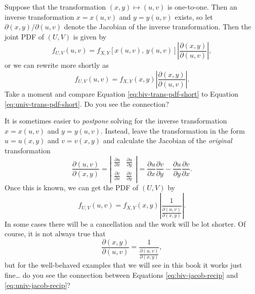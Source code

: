 \documentclass[captions=tableheading]{scrbook}
\begin{document}
Suppose that the transformation \((x,y)\longmapsto(u,v)\) is one-to-one. Then an inverse transformation \(x=x(u,v)\) and \(y=y(u,v)\) exists, so let \(\partial(x,y)/\partial(u,v)\) denote the Jacobian of the inverse transformation. Then the joint PDF of \((U,V)\) is given by 
\begin{equation}
f_{U,V}(u,v)=f_{X,Y}\left[x(u,v),\, y(u,v)\right]\left|\frac{\partial(x,y)}{\partial(u,v)}\right|,
\end{equation}
or we can rewrite more shortly as
\begin{equation}
f_{U,V}(u,v)=f_{X,Y}(x,y)\left|\frac{\partial(x,y)}{\partial(u,v)}\right|.\label{eq:biv-trans-pdf-short}
\end{equation}
Take a moment and compare Equation \ref{eq:biv-trans-pdf-short} to Equation \ref{eq:univ-trans-pdf-short}. Do you see the connection? 

\begin{rem}
It is sometimes easier to \emph{postpone} solving for the inverse transformation \(x=x(u,v)\) and \(y=y(u,v)\). Instead, leave the transformation in the form \(u=u(x,y)\) and \(v=v(x,y)\) and calculate the Jacobian of the \emph{original} transformation
\begin{equation}
\frac{\partial(u,v)}{\partial(x,y)}=\left|\begin{array}{cc}
\frac{\partial u}{\partial x} & \frac{\partial u}{\partial y}\\
\frac{\partial v}{\partial x} & \frac{\partial v}{\partial y}\end{array}\right|=\frac{\partial u}{\partial x}\frac{\partial v}{\partial y}-\frac{\partial u}{\partial y}\frac{\partial v}{\partial x}.
\end{equation}
Once this is known, we can get the PDF of \((U,V)\) by
\begin{equation}
f_{U,V}(u,v)=f_{X,Y}(x,y)\left|\frac{1}{\frac{\partial(u,v)}{\partial(x,y)}}\right|.
\end{equation}
In some cases there will be a cancellation and the work will be lot shorter. Of course, it is not always true that
\begin{equation}
\frac{\partial(x,y)}{\partial(u,v)}=\frac{1}{\frac{\partial(u,v)}{\partial(x,y)}},\label{eq:biv-jacob-recip}
\end{equation}
but for the well-behaved examples that we will see in this book it works just fine\ldots{} do you see the connection between Equations \ref{eq:biv-jacob-recip} and \ref{eq:univ-jacob-recip}?
\end{rem}
\end{document}
